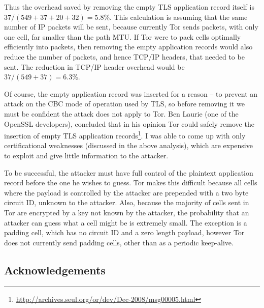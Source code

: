 \documentclass{article}
\begin{document}
Thus the overhead saved by removing the empty TLS application record itself is $37 / (549 + 37 + 20 + 32) = 5.8\%$.
This calculation is assuming that the same number of IP packets will be sent, because currently Tor sends packets, with only one cell, far smaller than the path MTU.
If Tor were to pack cells optimally efficiently into packets, then removing the empty application records would also reduce the number of packets, and hence TCP/IP headers, that needed to be sent.
The reduction in TCP/IP header overhead would be $37/(549 + 37) = 6.3\%$.

Of course, the empty application record was inserted for a reason -- to prevent an attack on the CBC mode of operation used by TLS, so before removing it we must be confident the attack does not apply to Tor.
Ben Laurie (one of the OpenSSL developers), concluded that in his opinion Tor could safely remove the insertion of empty TLS application records\footnote{\url{http://archives.seul.org/or/dev/Dec-2008/msg00005.html}}.
I was able to come up with only certificational weaknesses (discussed in the above analysis), which are expensive to exploit and give little information to the attacker.

To be successful, the attacker must have full control of the plaintext application record before the one he wishes to guess.
Tor makes this difficult because all cells where the payload is controlled by the attacker are prepended with a two byte circuit ID, unknown to the attacker.
Also, because the majority of cells sent in Tor are encrypted by a key not known by the attacker, the probability that an attacker can guess what a cell might be is extremely small.
The exception is a padding cell, which has no circuit ID and a zero length payload, however Tor does not currently send padding cells, other than as a periodic keep-alive.

\subsection*{Acknowledgements}

\end{document}
